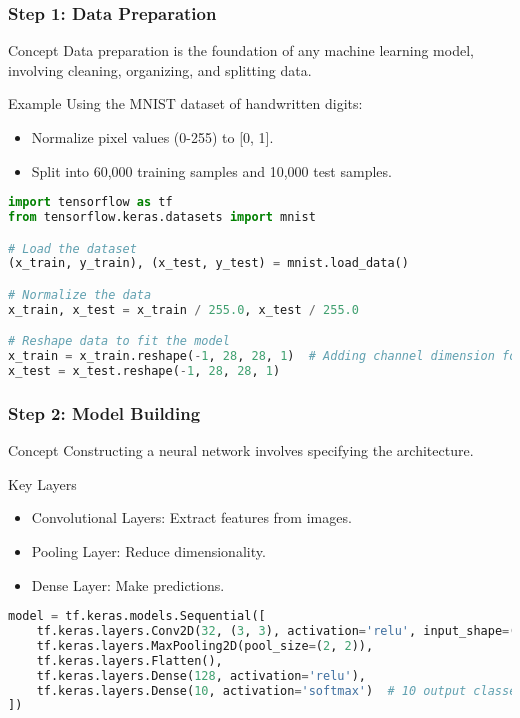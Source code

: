 \documentclass[aspectratio=169]{beamer}
\begin{document}
\begin{frame}[fragile]
    \frametitle{Step 1: Data Preparation}
    \begin{block}{Concept}
        Data preparation is the foundation of any machine learning model, involving cleaning, organizing, and splitting data.
    \end{block}
    \begin{block}{Example}
        Using the MNIST dataset of handwritten digits:
        \begin{itemize}
            \item Normalize pixel values (0-255) to [0, 1].
            \item Split into 60,000 training samples and 10,000 test samples.
        \end{itemize}
    \end{block}
    \begin{lstlisting}[language=Python]
import tensorflow as tf
from tensorflow.keras.datasets import mnist

# Load the dataset
(x_train, y_train), (x_test, y_test) = mnist.load_data()

# Normalize the data
x_train, x_test = x_train / 255.0, x_test / 255.0

# Reshape data to fit the model
x_train = x_train.reshape(-1, 28, 28, 1)  # Adding channel dimension for CNN
x_test = x_test.reshape(-1, 28, 28, 1)
    \end{lstlisting}
\end{frame}

\begin{frame}[fragile]
    \frametitle{Step 2: Model Building}
    \begin{block}{Concept}
        Constructing a neural network involves specifying the architecture.
    \end{block}
    \begin{block}{Key Layers}
        \begin{itemize}
            \item Convolutional Layers: Extract features from images.
            \item Pooling Layer: Reduce dimensionality.
            \item Dense Layer: Make predictions.
        \end{itemize}
    \end{block}
    \begin{lstlisting}[language=Python]
model = tf.keras.models.Sequential([
    tf.keras.layers.Conv2D(32, (3, 3), activation='relu', input_shape=(28, 28, 1)),
    tf.keras.layers.MaxPooling2D(pool_size=(2, 2)),
    tf.keras.layers.Flatten(),
    tf.keras.layers.Dense(128, activation='relu'),
    tf.keras.layers.Dense(10, activation='softmax')  # 10 output classes
])
    \end{lstlisting}
\end{frame}
\end{document}
